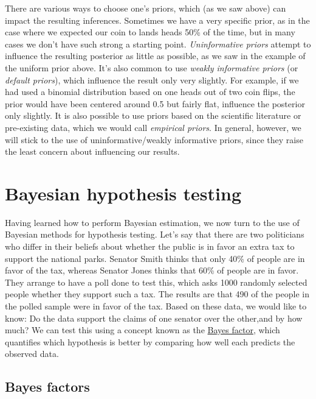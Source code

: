 \documentclass[12pt,]{book}
\theoremstyle{definition}
\theoremstyle{definition}
\theoremstyle{definition}
\theoremstyle{remark}
\begin{document}
There are various ways to choose one's priors, which (as we saw above) can impact the resulting inferences. Sometimes we have a very specific prior, as in the case where we expected our coin to lands heads 50\% of the time, but in many cases we don't have such strong a starting point. \emph{Uninformative priors} attempt to influence the resulting posterior as little as possible, as we saw in the example of the uniform prior above. It's also common to use \emph{weakly informative priors} (or \emph{default priors}), which influence the result only very slightly. For example, if we had used a binomial distribution based on one heads out of two coin flips, the prior would have been centered around 0.5 but fairly flat, influence the posterior only slightly. It is also possible to use priors based on the scientific literature or pre-existing data, which we would call \emph{empirical priors}. In general, however, we will stick to the use of uninformative/weakly informative priors, since they raise the least concern about influencing our results.

\hypertarget{bayesian-hypothesis-testing}{%
\section{Bayesian hypothesis testing}\label{bayesian-hypothesis-testing}}

Having learned how to perform Bayesian estimation, we now turn to the use of Bayesian methods for hypothesis testing. Let's say that there are two politicians who differ in their beliefs about whether the public is in favor an extra tax to support the national parks. Senator Smith thinks that only 40\% of people are in favor of the tax, whereas Senator Jones thinks that 60\% of people are in favor. They arrange to have a poll done to test this, which asks 1000 randomly selected people whether they support such a tax. The results are that 490 of the people in the polled sample were in favor of the tax. Based on these data, we would like to know: Do the data support the claims of one senator over the other,and by how much? We can test this using a concept known as the \href{https://bayesfactor.blogspot.com/2014/02/the-bayesfactor-package-this-blog-is.html}{Bayes factor}, which quantifies which hypothesis is better by comparing how well each predicts the observed data.

\hypertarget{Bayes-factors}{%
\subsection{Bayes factors}\label{Bayes-factors}}
\end{document}
